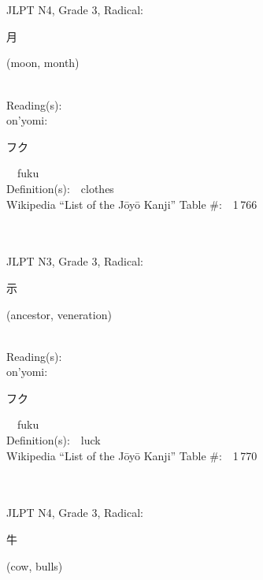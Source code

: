 \begin{multicols}{2}
\ \ \\
{\fontsize{34pt}{40pt}  }\ \ \\  %
{JLPT N4, Grade 3, Radical:\ \ {\begin{CJK}{UTF8}{min} 月 \end{CJK}} (moon, month) } \\
Reading(s):\ \ \\
{\hspace*{1em}}on'yomi:\ \ \\
{\hspace*{2em}}{\begin{CJK}{UTF8}{min} フク \end{CJK}}\ \ fuku\ \ \\
Definition(s):\ \ clothes \\
Wikipedia ``List of the J\=oy\=o Kanji'' Table \#:\ \ 1\,766 \\
\ \ \\
{\fontsize{34pt}{40pt}  }\ \ \\  %
{JLPT N3, Grade 3, Radical:\ \ {\begin{CJK}{UTF8}{min} 示 \end{CJK}} (ancestor, veneration) } \\
Reading(s):\ \ \\
{\hspace*{1em}}on'yomi:\ \ \\
{\hspace*{2em}}{\begin{CJK}{UTF8}{min} フク \end{CJK}}\ \ fuku\ \ \\
Definition(s):\ \ luck \\
Wikipedia ``List of the J\=oy\=o Kanji'' Table \#:\ \ 1\,770 \\
\ \ \\
{\fontsize{34pt}{40pt}  }\ \ \\  %
{JLPT N4, Grade 3, Radical:\ \ {\begin{CJK}{UTF8}{min} 牛 \end{CJK}} (cow, bulls) } \\

\end{multicols}
